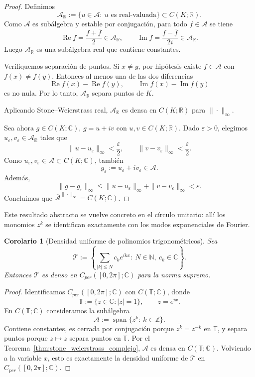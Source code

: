 \documentclass[a4paper,11pt]{report}
\newtheorem{corollary}[theorem]{Corolario}
\begin{document}
\begin{proof}
Definimos
\[
\mathcal A_{\mathbb R}:=\{u\in\mathcal A:\ u\text{ es real-valuada}\}\subset C(K;\mathbb R).
\]
Como $\mathcal A$ es sub\'algebra y estable por conjugaci\'on, para todo $f\in\mathcal A$ se tiene
\[
\operatorname{Re}f=\frac{f+\overline f}{2}\in\mathcal A_{\mathbb R},
\qquad
\operatorname{Im}f=\frac{f-\overline f}{2i}\in\mathcal A_{\mathbb R}.
\]
Luego $\mathcal A_{\mathbb R}$ es una sub\'algebra real que contiene constantes.

Verifiquemos separaci\'on de puntos. Si $x\neq y$, por hip\'otesis existe $f\in\mathcal A$ con $f(x)\neq f(y)$. Entonces al menos una de las dos diferencias
\[
\operatorname{Re}f(x)-\operatorname{Re}f(y),
\qquad
\operatorname{Im}f(x)-\operatorname{Im}f(y)
\]
es no nula. Por lo tanto, $\mathcal A_{\mathbb R}$ separa puntos de $K$.

Aplicando Stone--Weierstrass real, $\mathcal A_{\mathbb R}$ es densa en $C(K;\mathbb R)$ para $\|\cdot\|_\infty$.

Sea ahora $g\in C(K;\mathbb C)$, $g=u+iv$ con $u,v\in C(K;\mathbb R)$. Dado $\varepsilon>0$, elegimos $u_\varepsilon,v_\varepsilon\in\mathcal A_{\mathbb R}$ tales que
\[
\|u-u_\varepsilon\|_\infty<\frac{\varepsilon}{2},
\qquad
\|v-v_\varepsilon\|_\infty<\frac{\varepsilon}{2}.
\]
Como $u_\varepsilon,v_\varepsilon\in\mathcal A\subset C(K;\mathbb C)$, tambi\'en
\[
g_\varepsilon:=u_\varepsilon+i v_\varepsilon\in\mathcal A.
\]
Adem\'as,
\[
\|g-g_\varepsilon\|_\infty
\le \|u-u_\varepsilon\|_\infty+\|v-v_\varepsilon\|_\infty
<\varepsilon.
\]
Concluimos que $\overline{\mathcal A}^{\|\cdot\|_\infty}=C(K;\mathbb C)$.
\end{proof}

Este resultado abstracto se vuelve concreto en el c\'irculo unitario: all\'i los monomios $z^k$ se identifican exactamente con los modos exponenciales de Fourier.

\begin{corollary}[Densidad uniforme de polinomios trigonom\'etricos]\label{cor:densidad_trig_uniforme_stone}
Sea
\[
\mathcal T:=\left\{\sum_{|k|\le N}c_k e^{ikx}:\ N\in\mathbb N,\ c_k\in\mathbb C\right\}.
\]
Entonces $\mathcal T$ es denso en $C_{per}([0,2\pi];\mathbb C)$ para la norma supremo.
\end{corollary}

\begin{proof}
Identificamos $C_{per}([0,2\pi];\mathbb C)$ con $C(\mathbb T;\mathbb C)$, donde
\[
\mathbb T:=\{z\in\mathbb C:|z|=1\},\qquad z=e^{ix}.
\]
En $C(\mathbb T;\mathbb C)$ consideramos la sub\'algebra
\[
\mathcal A:=\operatorname{span}\{z^k:\ k\in\mathbb Z\}.
\]
Contiene constantes, es cerrada por conjugaci\'on porque $\overline{z^k}=z^{-k}$ en $\mathbb T$, y separa puntos porque $z\mapsto z$ separa puntos en $\mathbb T$. Por el Teorema~\ref{thm:stone_weierstrass_complejo}, $\mathcal A$ es densa en $C(\mathbb T;\mathbb C)$. Volviendo a la variable $x$, esto es exactamente la densidad uniforme de $\mathcal T$ en $C_{per}([0,2\pi];\mathbb C)$.
\end{proof}
\end{document}
